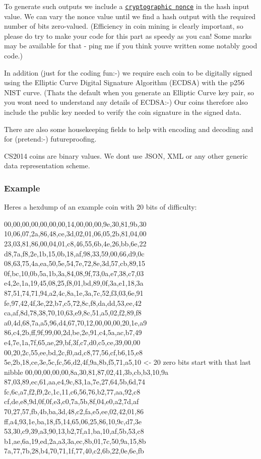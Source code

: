 To generate such outputs we include a \href{https://en.wikipedia.org/wiki/Cryptographic_nonce}{\tt cryptographic nonce} in the hash input value. We can vary the nonce value until we find a hash output with the required number of bits zero-\/valued. (Efficiency in coin mining is clearly important, so please do try to make your code for this part as speedy as you can! Some marks may be available for that -\/ ping me if you think you\textquotesingle{}ve written some notably good code.)

In addition (just for the coding fun\+:-\/) we require each coin to be digitally signed using the Elliptic Curve Digital Signature Algorithm (E\+C\+D\+SA) with the p256 N\+I\+ST curve. (That\textquotesingle{}s the default when you generate an Elliptic Curve key pair, so you won\textquotesingle{}t need to understand any details of E\+C\+D\+SA\+:-\/) Our coins therefore also include the public key needed to verify the coin signature in the signed data.

There are also some housekeeping fields to help with encoding and decoding and for (pretend\+:-\/) futureproofing.

C\+S2014 coins are binary values. We don\textquotesingle{}t use J\+S\+ON, X\+ML or any other generic data representation scheme.

\subsubsection*{Example}

Here\textquotesingle{}s a hexdump of an example coin with 20 bits of difficulty\+: \begin{DoxyVerb}    00,00,00,00,00,00,00,14,00,00,00,9e,30,81,9b,30
    10,06,07,2a,86,48,ce,3d,02,01,06,05,2b,81,04,00
    23,03,81,86,00,04,01,c8,46,55,6b,4e,26,bb,6e,22
    d8,7a,f8,2e,1b,15,0b,18,af,98,33,59,00,66,d9,0c
    08,63,75,4a,ea,50,5e,54,7e,72,8e,3d,57,cb,89,15
    0f,bc,10,0b,5a,1b,3a,84,08,9f,73,0a,e7,38,c7,03
    e4,2e,1a,19,45,08,25,f8,01,bd,89,0f,3a,e1,18,3a
    87,51,74,71,94,a2,4c,8a,1e,3a,7c,52,f3,03,6e,91
    fe,97,42,4f,3e,22,b7,c5,72,8c,f8,da,dd,53,ee,42
    ca,af,8d,78,38,70,10,63,e9,8c,51,a5,02,f2,89,f8
    a0,4d,68,7a,a5,96,d4,67,70,12,00,00,00,20,1e,a9
    86,c4,2b,ff,9f,99,00,2d,be,2e,91,c4,5a,ac,b7,49
    e4,7e,1a,7f,65,ae,29,bf,3f,c7,d0,c5,ce,39,00,00
    00,20,2c,55,ee,bd,2c,f0,ad,c8,77,56,cf,b6,15,e8
    5e,2b,18,ce,3e,5c,fc,56,d2,4f,9a,8b,f5,71,a5,10 <- 20 zero bits start with that last nibble 
    00,00,00,00,00,8a,30,81,87,02,41,3b,cb,b3,10,9a
    87,03,89,ec,61,aa,e4,9c,83,1a,7e,27,64,5b,6d,74
    fc,6c,a7,f2,f9,2c,1c,11,c6,56,76,b2,77,aa,92,c8
    cf,de,e8,9d,0f,0f,e3,c0,7a,5b,8f,04,e0,a2,7d,af
    70,27,57,fb,4b,ba,3d,48,c2,fa,e5,ee,02,42,01,86
    ff,a4,93,1e,ba,18,f5,14,65,06,25,86,10,9c,d7,3e
    53,30,c9,39,a3,90,13,b2,7f,a1,ba,10,af,5b,53,c8
    b1,ae,6a,19,ed,2a,a3,3a,ec,8b,01,7c,50,9a,15,8b
    7a,77,7b,28,b4,70,71,1f,77,40,c2,6b,22,0e,6e,fb
\end{DoxyVerb}


